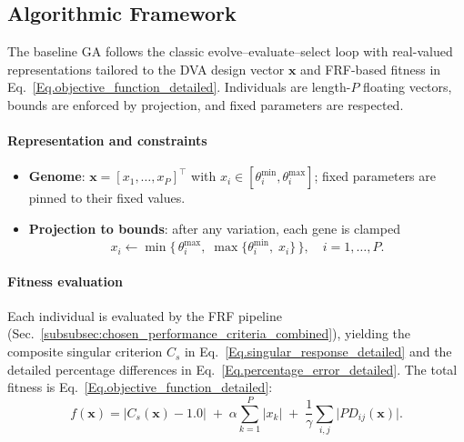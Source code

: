 \documentclass[12pt,a4paper]{article}
\begin{document}
    \subsection{Algorithmic Framework}
    The baseline GA follows the classic evolve–evaluate–select loop with real-valued representations tailored to the DVA design vector $\mathbf{x}$ and FRF-based fitness in Eq.~\eqref{Eq.objective_function_detailed}. Individuals are length-$P$ floating vectors, bounds are enforced by projection, and fixed parameters are respected.

    \paragraph{Representation and constraints}
    \begin{itemize}
        \item \textbf{Genome}: $\mathbf{x}=[x_1,\dots,x_P]^\top$ with $x_i\in[\theta_i^{\min},\theta_i^{\max}]$; fixed parameters are pinned to their fixed values.
        \item \textbf{Projection to bounds}: after any variation, each gene is clamped
        \begin{equation}\label{Eq.bound_projection}
            x_i \leftarrow \min\{\, \theta_i^{\max},\; \max\{\theta_i^{\min},\; x_i\}\,\},\quad i=1,\dots,P.
        \end{equation}
    \end{itemize}

    \paragraph{Fitness evaluation}
    Each individual is evaluated by the FRF pipeline (Sec.~\ref{subsubsec:chosen_performance_criteria_combined}), yielding the composite singular criterion $C_s$ in Eq.~\eqref{Eq.singular_response_detailed} and the detailed percentage differences in Eq.~\eqref{Eq.percentage_error_detailed}. The total fitness is Eq.~\eqref{Eq.objective_function_detailed}:
    \begin{equation}
        f(\mathbf{x})=\big|C_s(\mathbf{x})-1.0\big|\; +\; \alpha\sum_{k=1}^{P}|x_k|\; +\; \frac{1}{\gamma}\sum_{i,j}\big|PD_{ij}(\mathbf{x})\big|.
    \end{equation}
\end{document}
